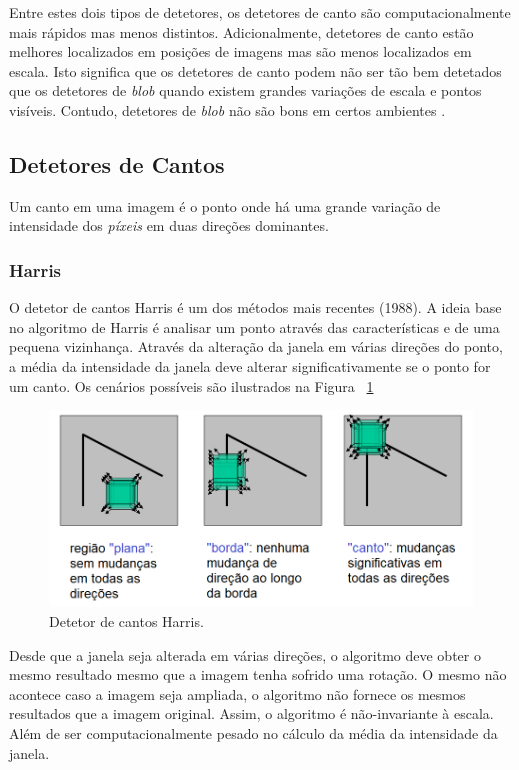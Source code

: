 Entre estes dois tipos de detetores, os detetores de canto são computacionalmente mais rápidos mas menos distintos. Adicionalmente, detetores de canto estão melhores localizados em posições de imagens mas são menos localizados em escala. Isto significa que os detetores de canto podem não ser tão bem detetados que os detetores de \textit{blob} quando existem grandes variações de escala e pontos visíveis. Contudo, detetores de \textit{blob} não são bons em certos ambientes \cite{Fraundorfer2012}.

\subsection{Detetores de Cantos}

Um canto em uma imagem é o ponto onde há uma grande variação de intensidade dos \textit{píxeis} em duas direções dominantes. 

\subsubsection{Harris}

O detetor de cantos Harris é um dos métodos mais recentes (1988). A ideia base no algoritmo de Harris é analisar um ponto através das características e de uma pequena vizinhança. Através da alteração da janela em várias direções do ponto, a média da intensidade da janela deve alterar significativamente se o ponto for um canto. Os cenários possíveis são ilustrados na Figura ~\ref{fig:harriscornerdetection}

\begin{figure}[h!]
	\centering
	\includegraphics[width=0.7\linewidth]{figures/HarrisCornerDetection}
	\caption{Detetor de cantos Harris. \cite{VisualOdometryRodasVehicles}}
	\label{fig:harriscornerdetection}
\end{figure}

Desde que a janela seja alterada em várias direções, o algoritmo deve obter o mesmo resultado mesmo que a imagem tenha sofrido uma rotação. O mesmo não acontece caso a imagem seja ampliada, o algoritmo não fornece os mesmos resultados que a imagem original. Assim, o algoritmo é não-invariante à escala. Além de ser computacionalmente pesado no cálculo da média da intensidade da janela. %


